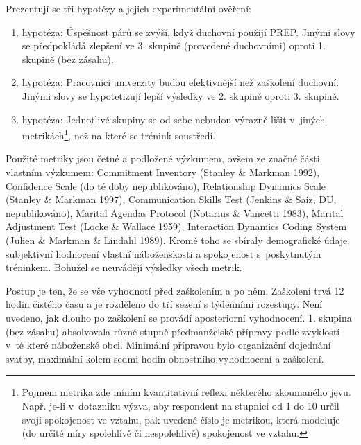 Prezentují se tři hypotézy a jejich experimentální ověření:
\begin{enumerate}
  \item{
    hypotéza: Úspěšnost párů se zvýší, když duchovní použijí PREP. Jinými slovy
    se předpokládá zlepšení ve 3. skupině (provedené duchovními) oproti 1.
    skupině (bez zásahu).
  }
  \item{
    hypotéza: Pracovníci univerzity budou efektivnější než zaškolení duchovní.
    Jinými slovy se hypotetizují lepší výsledky ve 2. skupině oproti 3. skupině.
  }
  \item{
    hypotéza: Jednotlivé skupiny se od sebe nebudou výrazně lišit v~jiných
    metrikách\footnote{%
      Pojmem metrika zde míním kvantitativní reflexi některého zkoumaného jevu.
      Např. je-li v~dotazníku výzva, aby respondent na stupnici od 1 do 10 určil
      svoji spokojenost ve vztahu, pak uvedené číslo je metrikou, která modeluje
      (do určité míry spolehlivě či nespolehlivě) spokojenost ve vztahu.
    }, než na které se trénink soustředí.
  }
\end{enumerate}

Použité metriky jsou četné a podložené výzkumem, ovšem ze značné části vlastním
výzkumem: Commitment Inventory (Stanley \& Markman
1992\cite{stanley1992assessing}), Confidence Scale (do té doby nepublikováno),
Relationship Dynamics Scale (Stanley \& Markman 1997\cite{stanley1997marriage}),
Communication Skills Test (Jenkins \& Saiz, DU, nepublikováno), Marital Agendas
Protocol (Notarius \& Vancetti 1983\cite{notarius1983marital}), Marital
Adjustment Test (Locke \& Wallace 1959\cite{locke1959short}), Interaction
Dynamics Coding System (Julien \& Markman \& Lindahl
1989\cite{julien1989comparison}). Kromě toho se sbíraly demografické údaje,
subjektivní hodnocení vlastní náboženskosti a spokojenost s~poskytnutým
tréninkem. Bohužel se neuvádějí výsledky všech metrik.

Postup je ten, že se vše vyhodnotí před zaškolením a po něm. Zaškolení trvá 12
hodin čistého času a je rozděleno do tří sezení s týdenními rozestupy. Není
uvedeno, jak dlouho po zaškolení se provádí aposteriorní vyhodnocení. 1. skupina
(bez zásahu) absolvovala různé stupně předmanželské přípravy podle zvyklostí
v~té které náboženské obci. Minimální přípravou bylo organizační dojednání
svatby, maximální kolem sedmi hodin obnostního vyhodnocení a zaškolení.

